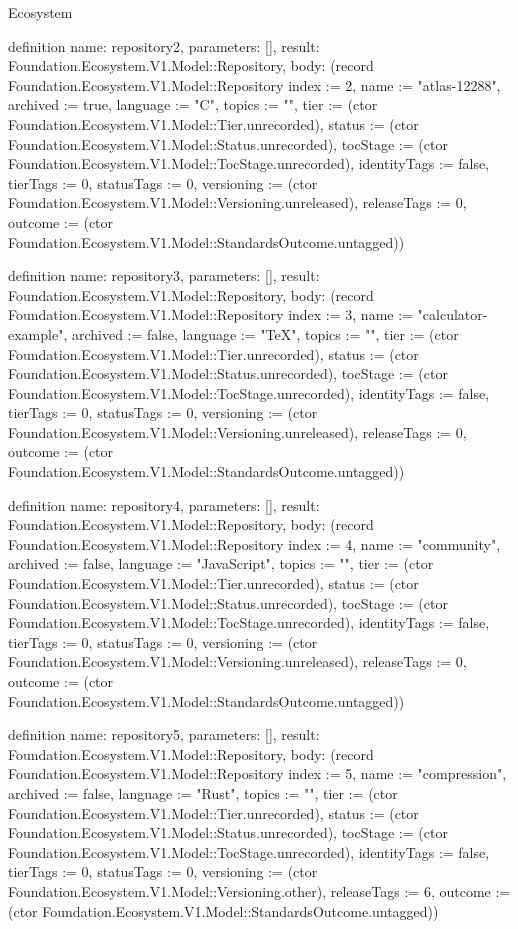 \begin{lexlean}{Ecosystem}
\begin{semanticmodule}
definition{
  name: repository2,
  parameters: [],
  result: Foundation.Ecosystem.V1.Model::Repository,
  body: (record Foundation.Ecosystem.V1.Model::Repository {index := 2, name := "atlas-12288", archived := true, language := "C", topics := "", tier := (ctor Foundation.Ecosystem.V1.Model::Tier.unrecorded), status := (ctor Foundation.Ecosystem.V1.Model::Status.unrecorded), tocStage := (ctor Foundation.Ecosystem.V1.Model::TocStage.unrecorded), identityTags := false, tierTags := 0, statusTags := 0, versioning := (ctor Foundation.Ecosystem.V1.Model::Versioning.unreleased), releaseTags := 0, outcome := (ctor Foundation.Ecosystem.V1.Model::StandardsOutcome.untagged)})
}

definition{
  name: repository3,
  parameters: [],
  result: Foundation.Ecosystem.V1.Model::Repository,
  body: (record Foundation.Ecosystem.V1.Model::Repository {index := 3, name := "calculator-example", archived := false, language := "TeX", topics := "", tier := (ctor Foundation.Ecosystem.V1.Model::Tier.unrecorded), status := (ctor Foundation.Ecosystem.V1.Model::Status.unrecorded), tocStage := (ctor Foundation.Ecosystem.V1.Model::TocStage.unrecorded), identityTags := false, tierTags := 0, statusTags := 0, versioning := (ctor Foundation.Ecosystem.V1.Model::Versioning.unreleased), releaseTags := 0, outcome := (ctor Foundation.Ecosystem.V1.Model::StandardsOutcome.untagged)})
}

definition{
  name: repository4,
  parameters: [],
  result: Foundation.Ecosystem.V1.Model::Repository,
  body: (record Foundation.Ecosystem.V1.Model::Repository {index := 4, name := "community", archived := false, language := "JavaScript", topics := "", tier := (ctor Foundation.Ecosystem.V1.Model::Tier.unrecorded), status := (ctor Foundation.Ecosystem.V1.Model::Status.unrecorded), tocStage := (ctor Foundation.Ecosystem.V1.Model::TocStage.unrecorded), identityTags := false, tierTags := 0, statusTags := 0, versioning := (ctor Foundation.Ecosystem.V1.Model::Versioning.unreleased), releaseTags := 0, outcome := (ctor Foundation.Ecosystem.V1.Model::StandardsOutcome.untagged)})
}

definition{
  name: repository5,
  parameters: [],
  result: Foundation.Ecosystem.V1.Model::Repository,
  body: (record Foundation.Ecosystem.V1.Model::Repository {index := 5, name := "compression", archived := false, language := "Rust", topics := "", tier := (ctor Foundation.Ecosystem.V1.Model::Tier.unrecorded), status := (ctor Foundation.Ecosystem.V1.Model::Status.unrecorded), tocStage := (ctor Foundation.Ecosystem.V1.Model::TocStage.unrecorded), identityTags := false, tierTags := 0, statusTags := 0, versioning := (ctor Foundation.Ecosystem.V1.Model::Versioning.other), releaseTags := 6, outcome := (ctor Foundation.Ecosystem.V1.Model::StandardsOutcome.untagged)})
}


\end{semanticmodule}
\end{lexlean}
